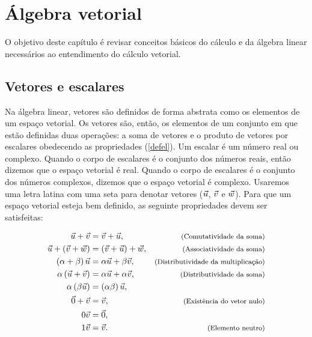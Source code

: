 

%
\chapter[Álgebra vetorial]{Álgebra vetorial}
O objetivo deste capítulo é revisar conceitos básicos do cálculo e da álgebra linear necessários ao entendimento do cálculo vetorial.    

\section{Vetores e escalares}
Na álgebra linear, vetores são definidos de forma abstrata como os elementos de um espaço vetorial. Os vetores são, então, os elementos de um conjunto em que estão definidas duas operações: a soma de vetores e o produto de vetores por escalares obedecendo as propriedades (\ref{defel}). Um escalar é um número real ou complexo. Quando o corpo de escalares é o conjunto dos números reais, então dizemos que o espaço vetorial é real. Quando o corpo de escalares é o conjunto dos números complexos, dizemos que o espaço vetorial é complexo. Usaremos uma letra latina com uma seta para denotar vetores ($\vec{u}$, $\vec{v}$ e $\vec{w}$).  Para que um espaço vetorial esteja bem definido, as seguinte propriedades devem ser satisfeitas:

\begin{subequations}\label{defel}
\begin{align}
\vec{u}+\vec{v}&=\vec{v}+\vec{u},&\hbox{\footnotesize (Comutatividade da soma)}\label{defelcom}\\
\vec{u}+\left(\vec{v}+\vec{w}\right)&=\left(\vec{v}+\vec{u}\right)+\vec{w},&\hbox{\footnotesize (Associatividade da soma)}\label{defelass}\\
\left(\alpha+\beta\right) \vec{u}&=\alpha\vec{u}+\beta\vec{v},&\hbox{\footnotesize (Distributividade da multiplicação)}\label{defeldist1}\\
\alpha \left(\vec{u}+\vec{v}\right)&= \alpha \vec{u}+\alpha\vec{v},&\hbox{\footnotesize (Distributividade da soma)}\label{defeldist2}\\
\alpha \left(\beta\vec{u}\right)&=\left(\alpha\beta\right)\vec{u},\label{defeldist3}\\
\vec{0}+\vec{v}&=\vec{v}, &\hbox{\footnotesize (Existência do vetor nulo)}\label{defelnulo}\\
0\vec{v}&=\vec{0},\label{defelnulo2}\\
1\vec{v}&=\vec{v}.&\hbox{\footnotesize (Elemento neutro)}\label{defelneutro}
\end{align}
\end{subequations}

